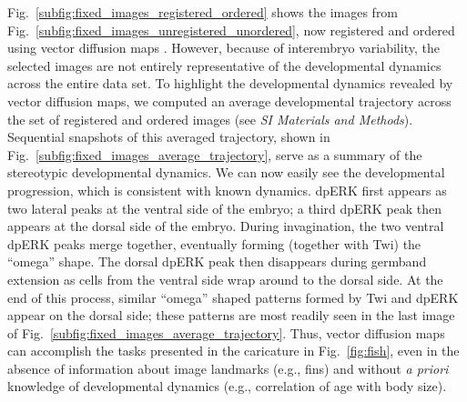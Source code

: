 \documentclass{pnastwo}
\newcommand{\SI}[0]{{\it SI Materials and Methods}}
\newcommand{\fig}[0]{Fig.}
\begin{document}
\begin{article}
\fig~\ref{subfig:fixed_images_registered_ordered} shows the images from \fig~\ref{subfig:fixed_images_unregistered_unordered}, now registered and ordered using vector diffusion maps \cite{singer2012vector}.
%
However, because of interembryo variability, the selected images are not entirely representative of the developmental dynamics across the entire data set.
%
To highlight the developmental dynamics revealed by vector diffusion maps, we computed an average developmental trajectory across the set of registered and ordered images (see \SI). 
%
Sequential snapshots of this averaged trajectory, shown in \fig~\ref{subfig:fixed_images_average_trajectory}, serve as a summary of the stereotypic developmental dynamics.
%
We can now easily see the developmental progression, which is consistent with known dynamics. 
%
dpERK first appears as two lateral peaks at the ventral side of the embryo; a third dpERK peak then appears at the dorsal side of the embryo.
%
During invagination, the two ventral dpERK peaks merge together, eventually forming (together with Twi) the ``omega'' shape.
%
The dorsal dpERK peak then disappears during germband extension as cells from the ventral side wrap around to the dorsal side.
%
At the end of this process, similar ``omega'' shaped patterns formed by Twi and dpERK appear on the dorsal side; these patterns are most readily seen in the last image of \fig~\ref{subfig:fixed_images_average_trajectory}.
%
Thus, vector diffusion maps can accomplish the tasks presented in the caricature in \fig~\ref{fig:fish}, even in the absence of information about image landmarks (e.g., fins) and without {\it a priori} knowledge of developmental dynamics (e.g., correlation of age with body size).


\end{article}
\end{document}
